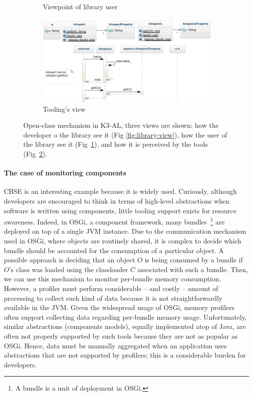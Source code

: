 \begin{figure}[ht]
\begin{subfigure}[b]{0.45\textwidth}
\caption{Viewpoint of library user}\label{fig:user-view}
\end{subfigure}
\begin{subfigure} {\linewidth}
\centering
\includegraphics[width=0.9\linewidth]{chapter2/fig/tooling-view.png}
\caption{Tooling's view}\label{fig:tooling-view}
\end{subfigure}
\caption{Open-class mechanism in K3-AL, three views are shown: how the developer o the library see it (Fig \ref{fig:library-view}), how the user of the library see it (Fig~\ref{fig:user-view}), and how it is perceived by the tools (Fig~\ref{fig:tooling-view}).}
\label{fig:k3-diagram}
\end{figure}


\paragraph{The case of monitoring components}

\gls{CBSE} is an interesting example because it is widely used.
Curiously, although developers are encouraged to think in terms of high-level abstractions when software is written using components, little tooling support exists for resource awareness.
Indeed, in OSGi, a component framework, many bundles~\footnote{A bundle is a unit of deployment in OSGi.} are deployed on top of a single JVM instance.
Due to the communication mechanism used in OSGi, where objects are routinely shared, it is complex to decide which bundle should be accounted for the consumption of a particular object.
A possible approach is deciding that an object $O$ is being consumed by a bundle if $O$'s class was loaded using the classloader $C$ associated with such a bundle.
Then, we can use this mechanism to monitor per-bundle memory consumption. 
However, a profiler must perform considerable -- and costly -- amount of processing to collect such kind of data because it is not straightforwardly available in the JVM. 
Given the widespread usage of OSGi, memory profilers often support collecting data regarding per-bundle memory usage.
Unfortunately, similar abstractions (components models), equally implemented atop of Java, are often not properly supported by such tools because they are not as popular as OSGi.
Hence, data must be manually aggregated when an application uses abstractions that are not supported by profilers; this is a considerable burden for developers.


